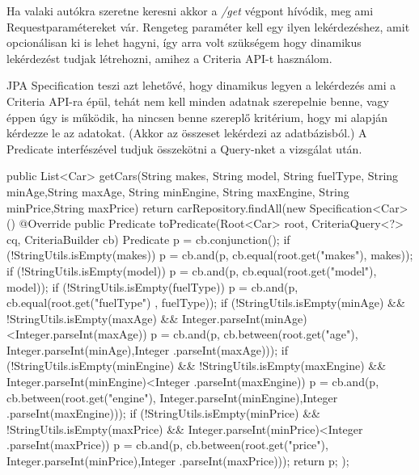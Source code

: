 
Ha valaki autókra szeretne keresni akkor a \textit{/get} végpont hívódik, meg ami Requestparamétereket vár. Rengeteg paraméter kell egy ilyen lekérdezéshez, amit opcionálisan ki is lehet hagyni, így arra volt szükségem hogy dinamikus lekérdezést tudjak létrehozni, amihez a Criteria API-t használom.

JPA Specification teszi azt lehetővé, hogy dinamikus legyen a lekérdezés ami a Criteria API-ra épül, tehát nem kell minden adatnak szerepelnie benne, vagy éppen úgy is működik, ha nincsen benne szereplő kritérium, hogy mi alapján kérdezze le az adatokat. (Akkor az összeset lekérdezi az adatbázisból.) A Predicate interfészével tudjuk összekötni a Query-nket a vizsgálat után.

\begin{java}
public List<Car> getCars(String makes, String model,
      String fuelType, String minAge,String maxAge,
      String minEngine, String maxEngine, 
      String minPrice,String maxPrice) {
  return carRepository.findAll(new Specification<Car>() {
    @Override
    public Predicate toPredicate(Root<Car> root,
     CriteriaQuery<?> cq, CriteriaBuilder cb) {
        Predicate p = cb.conjunction();
        if (!StringUtils.isEmpty(makes)){
            p = cb.and(p, cb.equal(root.get("makes"), makes));
        }
        if (!StringUtils.isEmpty(model)){
            p = cb.and(p, cb.equal(root.get("model"), model));
        }
        if (!StringUtils.isEmpty(fuelType)){
            p = cb.and(p, cb.equal(root.get("fuelType")
                                       , fuelType));
        }
        if (!StringUtils.isEmpty(minAge) && 
           !StringUtils.isEmpty(maxAge) &&
           Integer.parseInt(minAge)<Integer.parseInt(maxAge)){
            p = cb.and(p, cb.between(root.get("age"),
            Integer.parseInt(minAge),Integer
                                    .parseInt(maxAge)));
        }
        if (!StringUtils.isEmpty(minEngine) &&
           !StringUtils.isEmpty(maxEngine) &&
            Integer.parseInt(minEngine)<Integer
                                       .parseInt(maxEngine)){
            p = cb.and(p, cb.between(root.get("engine"),
            Integer.parseInt(minEngine),Integer
                                       .parseInt(maxEngine)));
        }
        if (!StringUtils.isEmpty(minPrice) &&
           !StringUtils.isEmpty(maxPrice) &&
            Integer.parseInt(minPrice)<Integer
                                       .parseInt(maxPrice)){
             p = cb.and(p, cb.between(root.get("price"),
              Integer.parseInt(minPrice),Integer
                                        .parseInt(maxPrice)));
         }
         return p;
     }
  });
}
\end{java}

